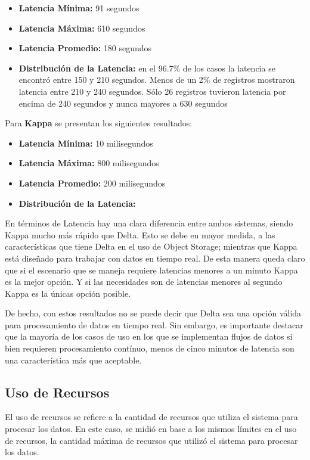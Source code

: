 \begin{itemize}
    \item \textbf{Latencia Mínima:} 91 segundos
    \item \textbf{Latencia Máxima:} 610 segundos
    \item \textbf{Latencia Promedio:} 180 segundos
    \item \textbf{Distribución de la Latencia:} en el 96.7\% de los casos la latencia se encontró entre 150 y 210 segundos. 
    Menos de un 2\% de registros mostraron latencia entre 210 y 240 segundos. 
    Sólo 26 registros tuvieron latencia por encima de 240 segundos y nunca mayores a 630 segundos 
\end{itemize}


Para \textbf{Kappa} se presentan los siguientes resultados: 

\begin{itemize}
    \item \textbf{Latencia Mínima:} 10 milisegundos
    \item \textbf{Latencia Máxima:} 800 milisegundos
    \item \textbf{Latencia Promedio:} 200 milisegundos
    \item \textbf{Distribución de la Latencia:} 
\end{itemize}

En términos de Latencia hay una clara diferencia entre ambos sistemas, siendo Kappa mucho más rápido que Delta.
Esto se debe en mayor medida, a las características que tiene Delta en el uso de Object Storage; mientras que Kappa está diseñado para trabajar con datos en tiempo real.
De esta manera queda claro que si el escenario que se maneja requiere latencias menores a un minuto Kappa es la mejor opción. 
Y si las necesidades son de latencias menores al segundo Kappa es la únicas opción posible.

De hecho, con estos resultados no se puede decir que Delta sea una opción válida para procesamiento de datos en tiempo real. 
Sin embargo, es importante destacar que la mayoría de los casos de uso en los que se implementan flujos de datos si bien requieren procesamiento contínuo, 
menos de cinco minutos de latencia son una característica más que aceptable.

\newpage
\subsection{Uso de Recursos}

El uso de recursos se refiere a la cantidad de recursos que utiliza el sistema para procesar los datos.
En este caso, se midió en base a los mismos límites en el uso de recursos, la cantidad máxima de recursos que utilizó el sistema para procesar los datos.

